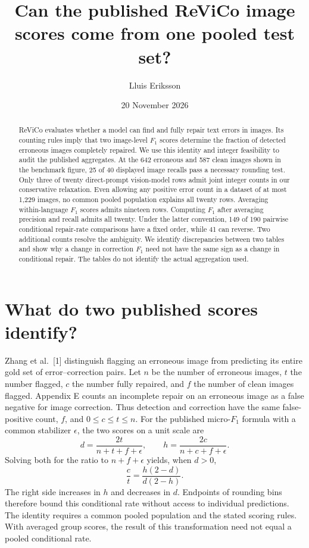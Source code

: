 \documentclass[11pt]{article}
\title{Can the published ReViCo image scores come from one pooled test set?}
\author{Lluis Eriksson}\date{20 November 2026}
\begin{document}
\maketitle
\begin{abstract}
ReViCo evaluates whether a model can find and fully repair text errors in images. Its counting rules imply that two image-level $F_1$ scores determine the fraction of detected erroneous images completely repaired. We use this identity and integer feasibility to audit the published aggregates. At the 642 erroneous and 587 clean images shown in the benchmark figure, 25 of 40 displayed image recalls pass a necessary rounding test. Only three of twenty direct-prompt vision-model rows admit joint integer counts in our conservative relaxation. Even allowing any positive error count in a dataset of at most 1,229 images, no common pooled population explains all twenty rows. Averaging within-language $F_1$ scores admits nineteen rows. Computing $F_1$ after averaging precision and recall admits all twenty. Under the latter convention, 149 of 190 pairwise conditional repair-rate comparisons have a fixed order, while 41 can reverse. Two additional counts resolve the ambiguity. We identify discrepancies between two tables and show why a change in correction $F_1$ need not have the same sign as a change in conditional repair. The tables do not identify the actual aggregation used.
\end{abstract}
\section{What do two published scores identify?}
Zhang et al.\ [1] distinguish flagging an erroneous image from predicting its entire gold set of error--correction pairs. Let $n$ be the number of erroneous images, $t$ the number flagged, $c$ the number fully repaired, and $f$ the number of clean images flagged. Appendix E counts an incomplete repair on an erroneous image as a false negative for image correction. Thus detection and correction have the same false-positive count, $f$, and $0\le c\le t\le n$. For the published micro-$F_1$ formula with a common stabilizer $\epsilon$, the two scores on a unit scale are
\[
 d=\frac{2t}{n+t+f+\epsilon},\qquad
 h=\frac{2c}{n+c+f+\epsilon}.
\]
Solving both for the ratio to $n+f+\epsilon$ yields, when $d>0$,
\[
 \frac ct=\frac{h(2-d)}{d(2-h)} .
\]
The right side increases in $h$ and decreases in $d$. Endpoints of rounding bins therefore bound this conditional rate without access to individual predictions. The identity requires a common pooled population and the stated scoring rules. With averaged group scores, the result of this transformation need not equal a pooled conditional rate.
\end{document}

